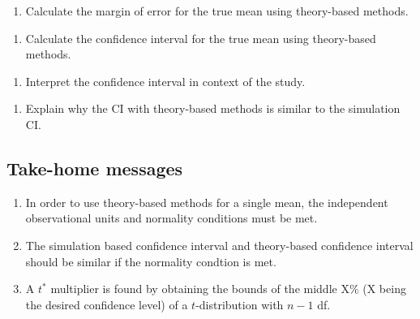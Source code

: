 \documentclass[
]{report}
\providecommand{\tightlist}{%
  \setlength{\itemsep}{0pt}\setlength{\parskip}{0pt}}
\begin{document}
\begin{enumerate}
\def\labelenumi{\arabic{enumi}.}
\setcounter{enumi}{4}
\tightlist
\item
  Calculate the margin of error for the true mean using theory-based methods.
\end{enumerate}

\vspace{0.6in}

\begin{enumerate}
\def\labelenumi{\arabic{enumi}.}
\setcounter{enumi}{5}
\tightlist
\item
  Calculate the confidence interval for the true mean using theory-based methods.
\end{enumerate}

\vspace{0.6in}

\begin{enumerate}
\def\labelenumi{\arabic{enumi}.}
\setcounter{enumi}{6}
\tightlist
\item
  Interpret the confidence interval in context of the study.
\end{enumerate}

\vspace{1in}

\begin{enumerate}
\def\labelenumi{\arabic{enumi}.}
\setcounter{enumi}{7}
\tightlist
\item
  Explain why the CI with theory-based methods is similar to the simulation CI.
\end{enumerate}

\vspace{1in}

\subsection{Take-home messages}\label{take-home-messages-13}

\begin{enumerate}
\def\labelenumi{\arabic{enumi}.}
\item
  In order to use theory-based methods for a single mean, the independent observational units and normality conditions must be met.
\item
  The simulation based confidence interval and theory-based confidence interval should be similar if the normality condtion is met.
\item
  A \(t^*\) multiplier is found by obtaining the bounds of the middle X\% (X being the desired confidence level) of a \(t\)-distribution with \(n - 1\) df.
\end{enumerate}
\end{document}
